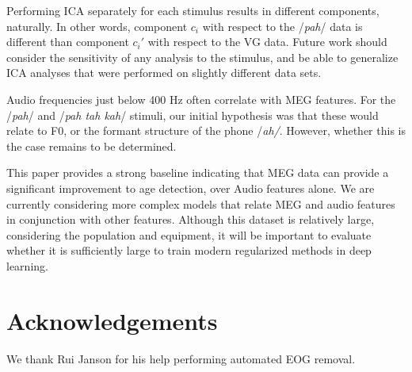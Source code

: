 \documentclass[a4paper]{article}
\newcommand{\FR}[1]{{\small \textcolor{red}{\hl{#1}}}}
\begin{document}
Performing ICA separately for each stimulus results in different components, naturally. In other words, component $c_i$ with respect to the /{\em pah}/ data is different than component $c_i'$ with respect to the VG data. Future work should consider the sensitivity of any analysis to the stimulus, and be able to generalize ICA analyses that were performed on slightly different data sets.

Audio frequencies just below 400 Hz often correlate with MEG features. For the /{\em pah}/ and /{\em pah tah kah}/ stimuli, our initial hypothesis was that these would relate to F0, or the formant structure of the phone /{\em ah/}. However, whether this is the case remains to be determined.


This paper provides a strong baseline indicating that MEG data can provide a significant improvement to age detection, over Audio features alone. We are currently considering more complex models that relate MEG and audio features in conjunction with other features. Although this dataset is relatively large, considering the population and equipment, it will be important to evaluate whether it is sufficiently large to train modern regularized methods in deep learning.

\section{Acknowledgements}

We thank Rui Janson for his help performing automated EOG removal.





\end{document}

